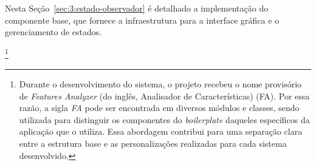 Nesta Seção~\ref{sec:3:estado-observador} é detalhado a implementação do componente base, que fornece a infraestrutura para a interface gráfica e o gerenciamento de estados.

\footnote{Durante o desenvolvimento do sistema, o projeto recebeu o nome provisório de \textit{Features Analyzer} (do inglês, Analisador de Características) (FA). Por essa razão, a sigla \textit{FA} pode ser encontrada em diversos módulos e classes, sendo utilizada para distinguir os componentes do \textit{boilerplate} daqueles específicos da aplicação que o utiliza. Essa abordagem contribui para uma separação clara entre a estrutura base e as personalizações realizadas para cada sistema desenvolvido.}

